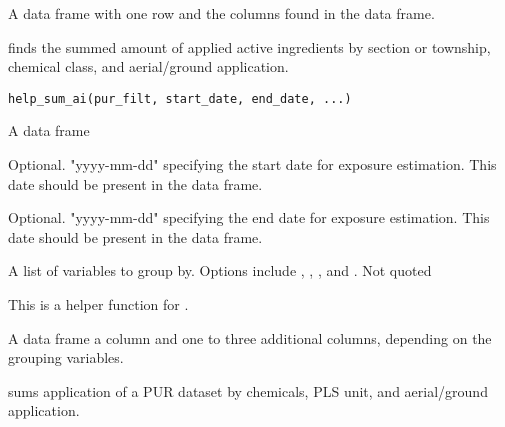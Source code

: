 \documentclass[a4paper]{book}
\begin{document}
%
\begin{Value}
A data frame with one row and the columns found in the
 data frame.
\end{Value}
%
\begin{Description}\relax
{} finds the summed amount of applied active ingredients by
section or township, chemical class, and aerial/ground application.
\end{Description}
%
\begin{Usage}
\begin{verbatim}
help_sum_ai(pur_filt, start_date, end_date, ...)
\end{verbatim}
\end{Usage}
%
\begin{Arguments}
\begin{ldescription}
\item[\code{pur\_filt}] A data frame

\item[\code{start\_date}] Optional. "yyyy-mm-dd" specifying the start date for
exposure estimation. This date should be present in the 
data frame.

\item[\code{end\_date}] Optional. "yyyy-mm-dd" specifying the end date for exposure
estimation. This date should be present in the 
data frame.

\item[\code{...}] A list of variables to group by. Options include ,
, , and . Not quoted
\end{ldescription}
\end{Arguments}
%
\begin{Details}\relax
This is a helper function for .
\end{Details}
%
\begin{Value}
A data frame a  column and one to three additional columns,
depending on the grouping variables.
\end{Value}
%
\begin{Description}\relax
{} sums application of a PUR dataset by chemicals,
PLS unit, and aerial/ground application.
\end{Description}
\end{document}
